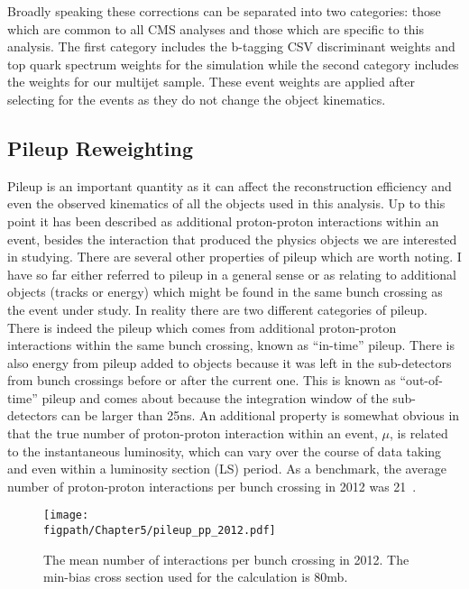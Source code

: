 Broadly speaking these corrections can be separated into two categories: those which are common to all CMS analyses and those which are specific to this analysis.
The first category includes the b-tagging CSV discriminant weights and top quark \pt spectrum weights for the \ttbar simulation while the second category includes the weights for our multijet sample.
These event weights are applied after selecting for the events as they do not change the object kinematics.

\subsection{Pileup Reweighting}
\label{sec:pileup_reweighting}

Pileup is an important quantity as it can affect the reconstruction efficiency and even the observed kinematics of all the objects used in this analysis.
Up to this point it has been described as additional proton-proton interactions within an event, besides the interaction that produced the physics objects we are interested in studying.
There are several other properties of pileup which are worth noting.
I have so far either referred to pileup in a general sense or as relating to additional objects (tracks or energy) which might be found in the same bunch crossing as the event under study.
In reality there are two different categories of pileup.
There is indeed the pileup which comes from additional proton-proton interactions within the same bunch crossing, known as ``in-time'' pileup.
There is also energy from pileup added to objects because it was left in the sub-detectors from bunch crossings before or after the current one.
This is known as ``out-of-time'' pileup and comes about because the integration window of the sub-detectors can be larger than 25\unit{ns}.
An additional property is somewhat obvious in that the true number of proton-proton interaction within an event, $\mu$, is related to the instantaneous luminosity, which can vary over the course of data taking and even within a luminosity section (LS) period.
As a benchmark, the average number of proton-proton interactions per bunch crossing in 2012 was 21~\cite{LumiPublic}.

\begin{figure}[!hbt]
    \centering
    \texttt{[image: \\figpath/Chapter5/pileup\_pp\_2012.pdf]}
    \caption{The mean number of interactions per bunch crossing in 2012. The min-bias cross section used for the calculation is 80\unit{mb}.}
    \label{fig:pileup_pp_2012}
\end{figure}

